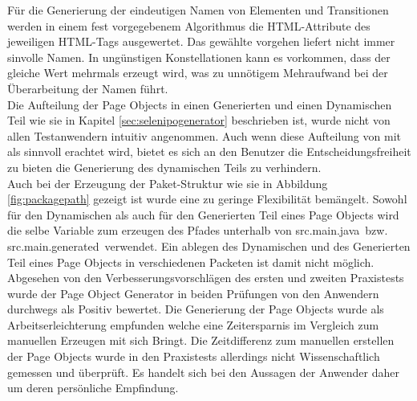 Für die Generierung der eindeutigen Namen von Elementen und Transitionen werden in einem fest vorgegebenem Algorithmus die HTML-Attribute des jeweiligen HTML-Tags ausgewertet. Das gewählte vorgehen liefert nicht immer sinvolle Namen. In ungünstigen Konstellationen kann es vorkommen, dass der gleiche Wert mehrmals erzeugt wird, was zu unnötigem Mehraufwand bei der Überarbeitung der Namen führt.\\
Die Aufteilung der Page Objects in einen Generierten und einen Dynamischen Teil wie sie in Kapitel \ref{sec:selenipogenerator} beschrieben ist, wurde nicht von allen Testanwendern intuitiv angenommen.
Auch wenn diese Aufteilung von mit als sinnvoll erachtet wird, bietet es sich an den Benutzer die Entscheidungsfreiheit zu bieten die Generierung des dynamischen Teils zu verhindern.\\
Auch bei der Erzeugung der Paket-Struktur wie sie in Abbildung \ref{fig:packagepath} gezeigt ist wurde eine zu geringe Flexibilität bemängelt.
Sowohl für den Dynamischen als auch für den Generierten Teil eines Page Objects wird die selbe Variable zum erzeugen des Pfades unterhalb von \grq src.main.java\grq\ bzw. \grq src.main.generated\grq\ verwendet. Ein ablegen des Dynamischen und des Generierten Teil eines Page Objects in verschiedenen Packeten ist damit nicht möglich.\\
Abgesehen von den Verbesserungsvorschlägen des ersten und zweiten Praxistests wurde der Page Object Generator in beiden Prüfungen von den Anwendern durchwegs als Positiv bewertet. Die Generierung der Page Objects wurde als Arbeitserleichterung empfunden welche eine Zeitersparnis im Vergleich zum manuellen Erzeugen mit sich Bringt. Die Zeitdifferenz zum manuellen erstellen der Page Objects wurde in den Praxistests allerdings nicht Wissenschaftlich gemessen und überprüft. Es handelt sich bei den Aussagen der Anwender daher um deren persönliche Empfindung.


